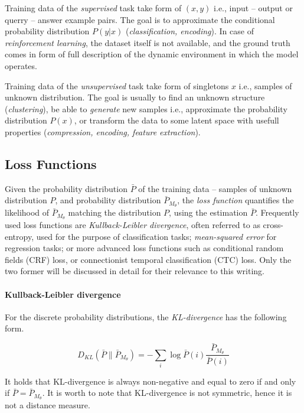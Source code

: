 Training data of the \emph{supervised} task take form of $(x,y)$ i.e., input -- output or querry -- answer example pairs. The goal is to approximate the conditional probability distribution $P\left(y|x\right)$ (\emph{classification, encoding}). In case of \emph{reinforcement learning}, the dataset itself is not available, and the ground truth comes in form of full description of the dynamic environment in which the model operates.

Training data of the \emph{unsupervised} task take form of singletons $x$ i.e., samples of unknown distribution. The goal is usually to find an unknown structure (\emph{clustering}), be able to \emph{generate} new samples i.e., approximate the probability distribution $P(x)$, or transform the data to some latent space with usefull properties (\emph{compression, encoding, feature extraction}).

\subsection{Loss Functions}
\label{sec:loss_fnc}

Given the probability distribution $\bar{P}$ of the training data -- samples of unknown distribution $P$, and probability distribution $\bar{P}_{M_\theta}$, the \emph{loss function} quantifies the likelihood of $\bar{P}_{M_\theta}$ matching the distribution $P$, using the estimation $\bar{P}$. Frequently used loss functions are \emph{Kullback-Leibler divergence}, often referred to as cross-entropy, used for the purpose of classification tasks; \emph{mean-squared error} for regression tasks; or more advanced loss functions such as conditional random fields (CRF) loss, or connectionist temporal classification (CTC) loss. Only the two former will be discussed in detail for their relevance to this writing.

\paragraph{Kullback-Leibler divergence}
For the discrete probability distributions, the \emph{KL-divergence} has the following form.

\begin{equation} \label{eqn:kl_divergence}
D_{KL}\left(\bar{P} \parallel \bar{P}_{M_\theta}\right) = - \sum\limits_{i} \log \bar{P}(i)\frac{\bar{P}_{M_\theta}}{\bar{P}(i)}
\end{equation}

It holds that KL-divergence is always non-negative and equal to zero if and only if $\bar{P} = \bar{P}_{M_\theta}$. It is worth to note that KL-divergence is not symmetric, hence it is not a distance measure.

